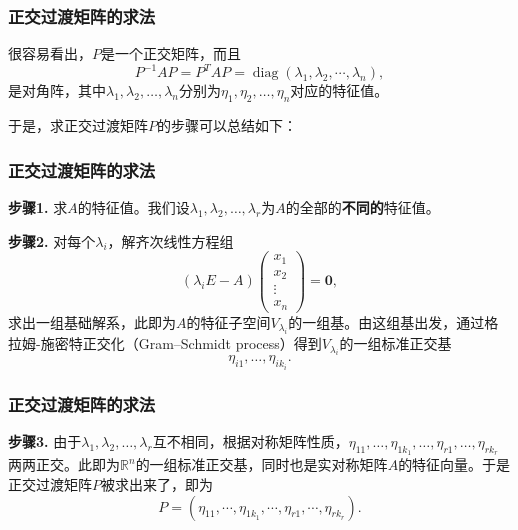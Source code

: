 
\begin{frame}
\frametitle{正交过渡矩阵的求法}

很容易看出，$P$是一个正交矩阵，而且
$$P^{-1}AP = P^TAP = \operatorname{diag}(\lambda_1, \lambda_2, \cdots, \lambda_n),$$
是对角阵，其中$\lambda_1, \lambda_2, \ldots, \lambda_n$分别为$\eta_1, \eta_2, \ldots, \eta_n$对应的特征值。

\pause
\vspace{1em}

于是，求正交过渡矩阵$P$的步骤可以总结如下：

\end{frame}


\begin{frame}
\frametitle{正交过渡矩阵的求法}

{\bfseries 步骤1.} 求$A$的特征值。我们设$\lambda_1, \lambda_2, \ldots, \lambda_r$为$A$的全部的{\bfseries 不同的}特征值。

\pause
\vspace{1em}

{\bfseries 步骤2.} 对每个$\lambda_i$，解齐次线性方程组
$$\left( \lambda_i E - A \right) \begin{pmatrix} x_1 \\ x_2 \\ \vdots \\ x_n \end{pmatrix} = \mathbf{0},$$
求出一组基础解系，此即为$A$的特征子空间$V_{\lambda_i}$的一组基。由这组基出发，通过格拉姆-施密特正交化（Gram–Schmidt process）得到$V_{\lambda_i}$的一组标准正交基
$$\eta_{i1}, \ldots, \eta_{ik_i}.$$

\end{frame}


\begin{frame}
\frametitle{正交过渡矩阵的求法}

{\bfseries 步骤3.} 由于$\lambda_1, \lambda_2, \ldots, \lambda_r$互不相同，根据对称矩阵性质，$\eta_{11}, \ldots, \eta_{1k_1}, \ldots, \eta_{r1}, \ldots, \eta_{rk_r}$两两正交。此即为$\mathbb{R}^n$的一组标准正交基，同时也是实对称矩阵$A$的特征向量。于是正交过渡矩阵$P$被求出来了，即为
$$P = (\eta_{11}, \cdots, \eta_{1k_1}, \cdots, \eta_{r1}, \cdots, \eta_{rk_r}).$$

\end{frame}

